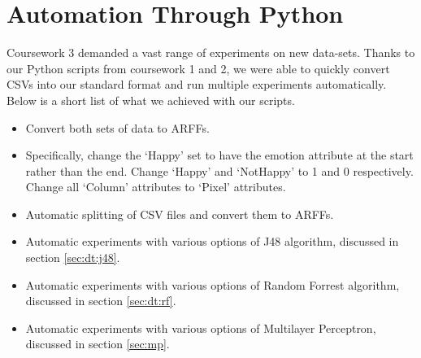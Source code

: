 \section{Automation Through Python}
\label{sec:auto}

Coursework 3 demanded a vast range of experiments on new data-sets. Thanks to our Python scripts from coursework 1 and 2, we were able to quickly convert CSVs into our standard format and run multiple experiments automatically. Below is a short list of what we achieved with our scripts.

\begin{itemize}
    \item Convert both sets of data to ARFFs.
    \item Specifically, change the `Happy' set to have the emotion attribute at the start rather than the end. Change `Happy' and `NotHappy' to 1 and 0 respectively. Change all `Column' attributes to `Pixel' attributes.
    \item Automatic splitting of CSV files and convert them to ARFFs.
    \item Automatic experiments with various options of J48 algorithm, discussed in section \ref{sec:dt:j48}.
    \item Automatic experiments with various options of Random Forrest algorithm, discussed in section \ref{sec:dt:rf}.
    \item Automatic experiments with various options of Multilayer Perceptron, discussed in section \ref{sec:mp}. 
\end{itemize}